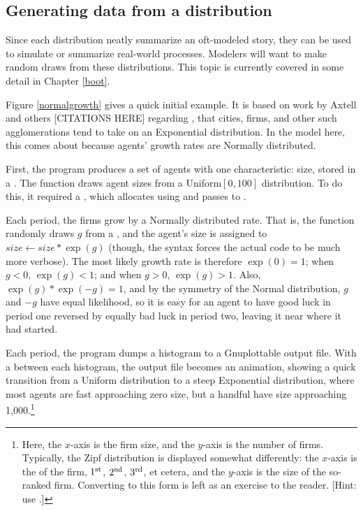 \subsection{Generating data from a distribution}
Since each distribution neatly summarize an oft-modeled story, they can
be used to simulate or summarize real-world processes. Modelers will want
to make random draws from these distributions. This topic is currently
covered in some detail in Chapter \ref{boot}.


Figure \ref{normalgrowth} gives a quick initial example. It is based on
work by Axtell and others [CITATIONS HERE] regarding ,
that cities, firms, and other such agglomerations tend to take on an
Exponential distribution. In the model here, this comes about because
agents' growth rates are Normally distributed.


First, the program produces a set of agents with one characteristic: size,
stored in a . The  function draws agent
sizes from a Uniform$[0,100]$ distribution.  To do this, it required a
, which  allocates using 
and passes to .

Each period, the firms grow by a Normally distributed rate. That is, the
 function randomly draws $g$ from a , and
the agent's size is assigned to $size \leftarrow size * \exp(g)$ (though, the
 syntax forces the actual code to be much more verbose).
The most likely growth rate is therefore $\exp(0) = 1$; 
when $g<0$, $\exp(g)<1$; and when $g>0$, $\exp(g)>1$. Also,
$\exp(g)*\exp(-g)=1$, and by the symmetry of the Normal distribution,
$g$ and $-g$ have equal likelihood, so it is easy for an agent to have
good luck in period one reversed by equally bad luck in period two,
leaving it near where it had started.

Each period, the program dumps a histogram to a Gnuplottable output
file. With a  between each histogram, the output file becomes
an animation, showing a quick transition from a Uniform distribution to
a steep Exponential distribution, where most agents are fast approaching
zero size, but a handful have size approaching 1,000.\footnote{Here,
the $x$-axis is the firm size, and the $y$-axis is the number of
firms. Typically, the Zipf distribution is displayed somewhat differently:
the $x$-axis is the  of the firm, $1^{\rm st}$,  $2^{\rm nd}$,
$3^{\rm rd}$, et cetera, and the $y$-axis is the size of the so-ranked
firm. Converting to this form is left as an exercise to the reader. [Hint:
use .]}




